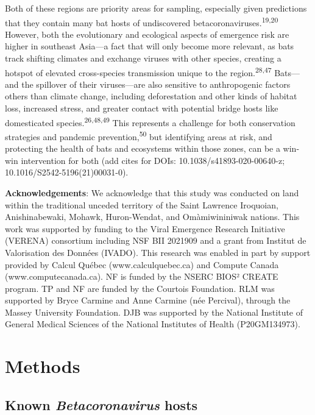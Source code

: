 \documentclass[11pt]{article}
\begin{document}
Both of these regions are priority areas for sampling, especially given
predictions that they contain many bat hosts of undiscovered
betacoronaviruses.\textsuperscript{19,20} However, both the evolutionary
and ecological aspects of emergence risk are higher in southeast
Asia---a fact that will only become more relevant, as bats track
shifting climates and exchange viruses with other species, creating a
hotspot of elevated cross-species transmission unique to the
region.\textsuperscript{28,47} Bats---and the spillover of their
viruses---are also sensitive to anthropogenic factors others than
climate change, including deforestation and other kinds of habitat loss,
increased stress, and greater contact with potential bridge hosts like
domesticated species.\textsuperscript{26,48,49} This represents a
challenge for both conservation strategies and pandemic
prevention,\textsuperscript{50} but identifying areas at risk, and
protecting the health of bats and ecosystems within those zones, can be
a win-win intervention for both (add cites for DOIs:
10.1038/s41893-020-00640-z; 10.1016/S2542-5196(21)00031-0).

\textbf{Acknowledgements}: We acknowledge that this study was conducted
on land within the traditional unceded territory of the Saint Lawrence
Iroquoian, Anishinabewaki, Mohawk, Huron-Wendat, and Omàmiwininiwak
nations. This work was supported by funding to the Viral Emergence
Research Initiative (VERENA) consortium including NSF BII 2021909 and a
grant from Institut de Valorisation des Données (IVADO). This research
was enabled in part by support provided by Calcul Québec
(www.calculquebec.ca) and Compute Canada (www.computecanada.ca). NF is
funded by the NSERC BIOS² CREATE program. TP and NF are funded by the
Courtois Foundation. RLM was supported by Bryce Carmine and Anne Carmine
(née Percival), through the Massey University Foundation. DJB was
supported by the National Institute of General Medical Sciences of the
National Institutes of Health (P20GM134973).

\newpage

\hypertarget{methods}{%
\section{Methods}\label{methods}}

\hypertarget{known-betacoronavirus-hosts}{%
\subsection{\texorpdfstring{Known \emph{Betacoronavirus}
hosts}{Known Betacoronavirus hosts}}\label{known-betacoronavirus-hosts}}
\end{document}
